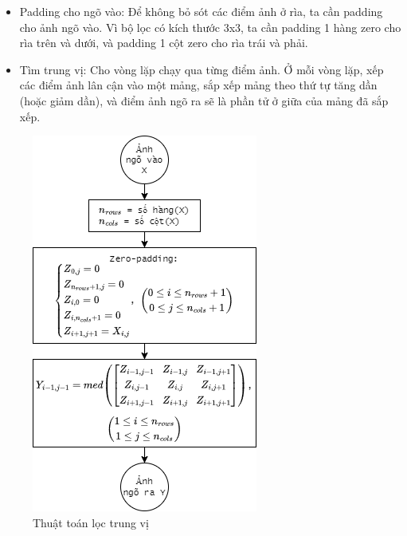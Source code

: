 \begin{itemize}
    \item Padding cho ngõ vào: Để không bỏ sót các điểm ảnh ở rìa, ta cần padding cho ảnh ngõ vào. Vì bộ lọc có kích thước 3x3, ta cần padding 1 hàng zero cho rìa trên và dưới, và padding 1 cột zero cho rìa trái và phải.

    \item Tìm trung vị: Cho vòng lặp chạy qua từng điểm ảnh. Ở mỗi vòng lặp, xếp các điểm ảnh lân cận vào một mảng, sắp xếp mảng theo thứ tự tăng dần (hoặc giảm dần), và điểm ảnh ngõ ra sẽ là phần tử ở giữa của mảng đã sắp xếp.
\end{itemize}

\begin{figure}[H]
    \centering
    \includegraphics[width=.5\linewidth]{../images/median_filtering_algorithm.png}
    \caption{Thuật toán lọc trung vị}
    \label{fig:median_filtering_algorithm}
\end{figure}

